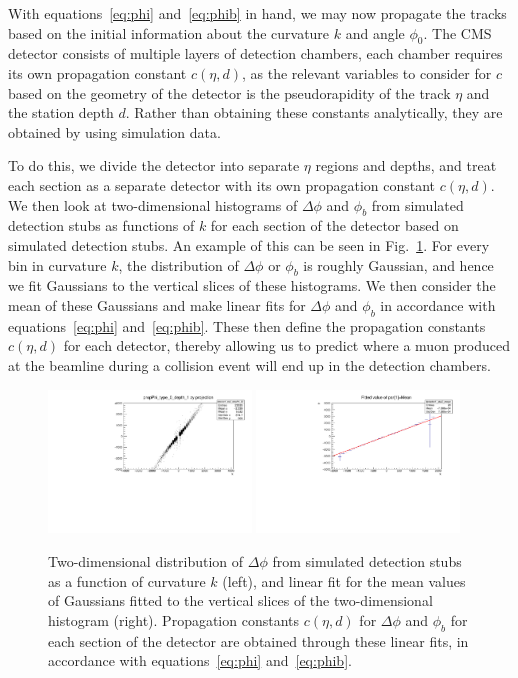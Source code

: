 With equations~\ref{eq:phi} and~\ref{eq:phib} in hand, we may now propagate the tracks based on the initial information about the curvature $k$ and angle $\phi_0$.
The CMS detector consists of multiple layers of detection chambers, each chamber requires its own propagation constant $c(\eta,d)$, as the relevant variables to consider for $c$ based on the geometry of the detector is the pseudorapidity of the track $\eta$ and the station depth $d$.
Rather than obtaining these constants analytically, they are obtained by using simulation data. %

To do this, we divide the detector into separate $\eta$ regions and depths, and treat each section as a separate detector with its own propagation constant $c(\eta,d)$.
We then look at two-dimensional histograms of $\Delta\phi$ and $\phi_b$ from simulated detection stubs as functions of $k$ for each section of the detector based on simulated detection stubs.
An example of this can be seen in Fig.~\ref{fig:deltaPhiHist}.
For every bin in curvature $k$, the distribution of $\Delta\phi$ or $\phi_b$ is roughly Gaussian, and hence we fit Gaussians to the vertical slices of these histograms.
We then consider the mean of these Gaussians and make linear fits for $\Delta\phi$ and $\phi_b$ in accordance with equations~\ref{eq:phi} and~\ref{eq:phib}.
These then define the propagation constants $c(\eta,d)$ for each detector, thereby allowing us to predict where a muon produced at the beamline during a collision event will end up in the detection chambers.

\begin{figure}[htbp]
  \centering
  \includegraphics[width=0.48\textwidth]{fig/TPS/deltaPhi_2D.pdf}
  \includegraphics[width=0.48\textwidth]{fig/TPS/deltaPhi_mean.pdf}
  \caption{Two-dimensional distribution of $\Delta\phi$ from simulated detection stubs as a function of curvature $k$ (left), and linear fit for the mean values of Gaussians fitted to the vertical slices of the two-dimensional histogram (right). Propagation constants $c(\eta,d)$ for $\Delta\phi$ and $\phi_b$ for each section of the detector are obtained through these linear fits, in accordance with equations~\ref{eq:phi} and~\ref{eq:phib}.}
  \label{fig:deltaPhiHist}
\end{figure}


